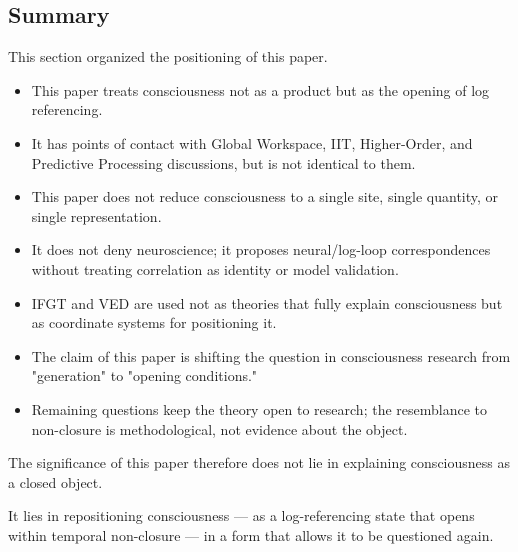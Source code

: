 \subsection{Summary}


This section organized the positioning of this paper.

\begin{itemize}
\item This paper treats consciousness not as a product but as the opening of log referencing.
\item It has points of contact with Global Workspace, IIT, Higher-Order, and Predictive Processing discussions, but is not identical to them.
\item This paper does not reduce consciousness to a single site, single quantity, or single representation.
\item It does not deny neuroscience; it proposes neural/log-loop correspondences without treating correlation as identity or model validation.
\item IFGT and VED are used not as theories that fully explain consciousness but as coordinate systems for positioning it.
\item The claim of this paper is shifting the question in consciousness research from "generation" to "opening conditions."
\item Remaining questions keep the theory open to research; the resemblance to non-closure is methodological, not evidence about the object.
\end{itemize}

The significance of this paper therefore does not lie in explaining consciousness as a closed object.

It lies in repositioning consciousness — as a log-referencing state that opens within temporal non-closure — in a form that allows it to be questioned again.
